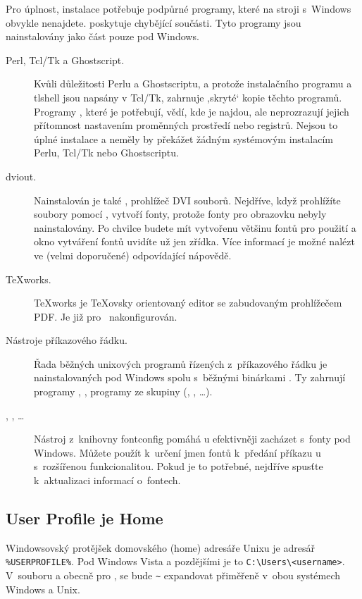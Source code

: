 \documentclass[\classoptions,slovak,english,czech]{\classname}
\newcommand{\singleuv}[1]{,#1`}
\begin{document}
Pro úplnost, instalace \TL{} potřebuje podpůrné programy,
které na stroji s~Windows obvykle nenajdete.
\TL{} poskytuje chybějící součásti. Tyto programy jsou nainstalovány jako 
část \TL{} pouze pod Windows.

\begin{description}
\item[Perl, Tcl/Tk a Ghostscript.] Kvůli důležitosti Perlu a Ghostscriptu,
a protože \GUI{} instalačního programu a tlshell jsou napsány v Tcl/Tk, 
zahrnuje \TL{} \singleuv{skryté} kopie těchto programů.  
Programy \TL{}, které je potřebují, vědí, kde je najdou, ale
neprozrazují jejich přítomnost nastavením proměnných prostředí nebo 
registrů. Nejsou to úplné instalace a neměly by překážet žádným 
systémovým instalacím Perlu, Tcl/Tk nebo Ghostscriptu.

\item[dviout.] Nainstalován je také , prohlížeč
  DVI souborů.  Nejdříve, když prohlížíte soubory pomocí 
  , vytvoří fonty, 
  protože fonty pro obrazovku nebyly nainstalovány. Po chvilce 
  budete mít vytvořenu většinu fontů pro použití a okno 
  vytváření fontů uvidíte už jen zřídka.  Více informací
  je možné nalézt ve (velmi doporučené) odpovídající nápovědě.
\item[\TeX{}works.]  \TeX{}works je \TeX ovsky orientovaný
  editor se zabudovaným prohlížečem PDF. 
  Je již pro \TL\ nakonfigurován.

\item[Nástroje příkazového řádku.] Řada běžných unixových
  programů řízených z~příkazového řádku je nainstalovaných
  pod Windows spolu s~běžnými binárkami \TL. Ty zahrnují
  programy , ,%
  programy ze skupiny  (,
  , \ldots).
     
\item[, , \ldots] Nástroj z~knihovny 
  fontconfig pomáhá \XeTeX{}u efektivněji zacházet s~fonty pod Windows.  
  Můžete použít  k~určení jmen fontů 
  k~předání příkazu \XeTeX{}u  s~rozšířenou funkcionalitou. 
  Pokud je to potřebné, nejdříve spusťte 
  k~aktualizaci informací o~fontech.
\end{description}

\subsection{User Profile je Home}
\label{sec:winhome}
Windowsovský protějšek domovského (home) adresáře Unixu je adresář \verb|%USERPROFILE%|.
Pod Windows Vista a pozdějšími je to \verb|C:\Users\<username>|.
V~souboru  a obecně pro \KPS{}, se bude \verb|~| expandovat
přiměřeně v~obou systémech Windows a Unix.
\end{document}
